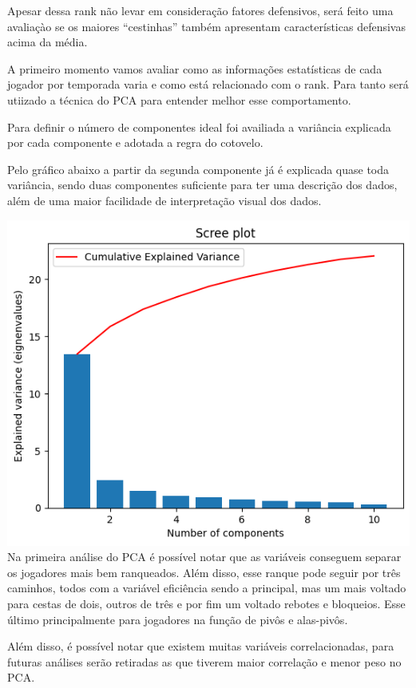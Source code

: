 \documentclass[
]{book}
\begin{document}
Apesar dessa rank não levar em consideração fatores defensivos, será feito uma avaliaçào se os maiores ``cestinhas'' também apresentam características defensivas acima da média.

A primeiro momento vamos avaliar como as informações estatísticas de cada jogador por temporada varia e como está relacionado com o rank. Para tanto será utiizado a técnica do PCA para entender melhor esse comportamento.

Para definir o número de componentes ideal foi availiada a variância explicada por cada componente e adotada a regra do cotovelo.

Pelo gráfico abaixo a partir da segunda componente já é explicada quase toda variância, sendo duas componentes suficiente para ter uma descrição dos dados, além de uma maior facilidade de interpretação visual dos dados.

\includegraphics{imagens/3.png} Na primeira análise do PCA é possível notar que as variáveis conseguem separar os jogadores mais bem ranqueados. Além disso, esse ranque pode seguir por três caminhos, todos com a variável eficiência sendo a principal, mas um mais voltado para cestas de dois, outros de três e por fim um voltado rebotes e bloqueios. Esse último principalmente para jogadores na função de pivôs e alas-pivôs.

Além disso, é possível notar que existem muitas variáveis correlacionadas, para futuras análises serão retiradas as que tiverem maior correlação e menor peso no PCA.
\end{document}
